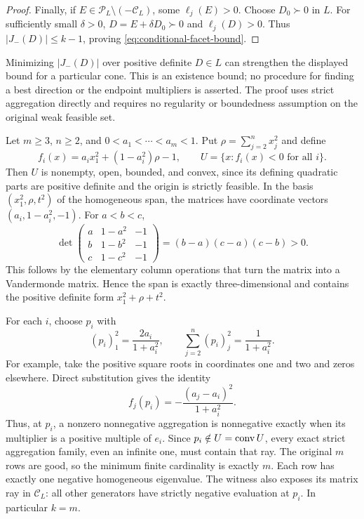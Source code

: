 \begin{proof}
Finally, if $E\in\mathcal P_L\setminus(-\mathcal C_L)$, some
$\ell_j(E)>0$. Choose $D_0\succ0$ in $L$. For sufficiently small
$\delta>0$, $D=E+\delta D_0\succ0$ and $\ell_j(D)>0$.
Thus $|J_-(D)|\leq k-1$, proving
\eqref{eq:conditional-facet-bound}.
\end{proof}

Minimizing $|J_-(D)|$ over positive definite $D\in L$ can strengthen
the displayed bound for a particular cone. This is an existence bound;
no procedure for finding a best direction or the endpoint multipliers is
asserted. The proof uses strict aggregation directly and requires no
regularity or boundedness assumption on the original weak feasible set.

\begin{example}
\label{ex:many-ellipsoids}
Let $m\geq3$, $n\geq2$, and $0<a_1<\cdots<a_m<1$. Put
$\rho=\sum_{j=2}^n x_j^2$ and define
\begin{equation}\label{eq:many-ellipsoids}
 f_i(x)=a_i x_1^2+(1-a_i^2)\rho-1,\qquad
 U=\{x:f_i(x)<0\text{ for all }i\}.
\end{equation}
Then $U$ is nonempty, open, bounded, and convex, since its defining
quadratic parts are positive definite and the origin is strictly feasible.
In the basis $(x_1^2,\rho,t^2)$ of the homogeneous span, the matrices
have coordinate vectors $(a_i,1-a_i^2,-1)$. For $a<b<c$,
\begin{equation}\label{eq:span-vandermonde}
 \det\begin{pmatrix}a&1-a^2&-1\\b&1-b^2&-1\\c&1-c^2&-1\end{pmatrix}
 =(b-a)(c-a)(c-b)>0.
\end{equation}
This follows by the elementary column operations that turn the matrix
into a Vandermonde matrix. Hence the span is exactly three-dimensional
and contains the positive definite form $x_1^2+\rho+t^2$.

For each $i$, choose $p_i$ with
\begin{equation}\label{eq:many-witness}
 (p_i)_1^2=\frac{2a_i}{1+a_i^2},\qquad
 \sum_{j=2}^n(p_i)_j^2=\frac1{1+a_i^2}.
\end{equation}
For example, take the positive square roots in coordinates one and two
and zeros elsewhere. Direct substitution gives the identity
\begin{equation}\label{eq:many-witness-slack}
 f_j(p_i)=-\frac{(a_j-a_i)^2}{1+a_i^2}.
\end{equation}
Thus, at $p_i$, a nonzero nonnegative aggregation is nonnegative
exactly when its multiplier is a positive multiple of $e_i$.
Since $p_i\notin U=\operatorname{conv} U$, every exact strict aggregation family,
even an infinite one, must contain that ray. The original $m$ rows are
good, so the minimum finite cardinality is exactly $m$. Each row has
exactly one negative homogeneous eigenvalue. The witness also exposes
its matrix ray in $\mathcal C_L$: all other generators have strictly
negative evaluation at $p_i$. In particular $k=m$.


\end{example}
